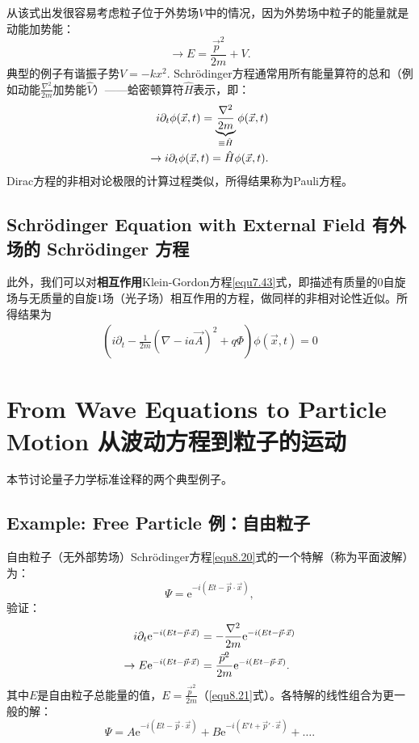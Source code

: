 从该式出发很容易考虑粒子位于外势场$V$中的情况，因为外势场中粒子的能量就是动能加势能：
\[
	\to E = \frac{\vec{p}^2}{2m} + V.
\]
典型的例子有谐振子势$V = -k x^2$. Schrödinger方程通常用所有能量算符的总和（例如动能$\frac{\nabla^2}{2m}$加势能$\hat{V}$）——蛤密顿算符$\hat{H}$表示，即：
\begin{align}
	i \partial_t \phi(\vec{x}, t) = \underbrace{\frac{\nabla^2}{2m} }_{\equiv \hat{H}} \phi(\vec{x}, t) \notag \\
\label{equ8.22}
	\to i \partial_t \phi(\vec{x}, t) = \hat{H} \phi(\vec{x}, t).
\end{align}
Dirac方程的非相对论极限的计算过程类似，所得结果称为Pauli方程。



\subsection[有外场的 Schrödinger 方程]{Schrödinger Equation with External Field 有外场的 Schrödinger 方程}\label{sec8.4.1}

此外，我们可以对{\bf 相互作用}Klein-Gordon方程\eqref{equ7.43}式，即描述有质量的$0$自旋场与无质量的自旋$1$场（光子场）相互作用的方程，做同样的非相对论性近似。所得结果为
\begin{align}
\label{equ8.23}
	\left(i\partial_t-\frac{1}{2m}\left(\nabla-ia\vec{A}\right)^2+q\Phi\right)\phi(\vec{x},t)=0
\end{align}

\section[从波动方程到粒子的运动]{From Wave Equations to Particle Motion \quad 从波动方程到粒子的运动}\label{sec8.5}
本节讨论量子力学标准诠释的两个典型例子。

\subsection[例：自由粒子]{Example: Free Particle \quad 例：自由粒子}\label{sec8.5.1}
自由粒子（无外部势场）Schrödinger方程\eqref{equ8.20}式的一个特解（称为平面波解）为：
\begin{equation}
\label{equ8.24}
	\Psi = \mathrm{e}^{-i (Et - \vec{p} \cdot \vec{x})},
\end{equation}
验证：
\begin{align}
	i \partial_t \mathrm{e}^{-i (Et - \vec{p} \cdot \vec{x}) } &= -\frac{\nabla^2}{2m} \mathrm{e}^{-i (Et - \vec{p} \cdot \vec{x}) } \notag \\
\label{equ8.25}
	\to E \mathrm{e}^{-i(Et - \vec{p} \cdot \vec{x}) } &= \frac{\vec{p}^2}{2m} \mathrm{e}^{-i(Et - \vec{p} \cdot \vec{x}) }.
\end{align}
其中$E$是自由粒子总能量的值，$E = \frac{\vec{p}^2}{2m}$（\eqref{equ8.21}式）。各特解的线性组合为更一般的解：
\[ \Psi = A \mathrm{e}^{-i(Et - \vec{p} \cdot \vec{x}) } + B \mathrm{e}^{-i (E' t + \vec{p}' \cdot \vec{x}) } + \dots . \]

